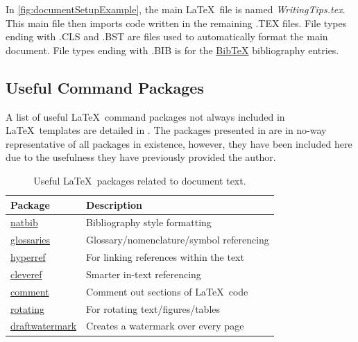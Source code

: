\noindent
In \cref{fig:documentSetupExample}, the main \LaTeX\ file is named \textit{WritingTips.tex}. 
This main file then imports code written in the remaining .TEX files. 
File types ending with .CLS and .BST are files used to automatically format the main document. 
File types ending with .BIB is for the \href{https://www.bibtex.org/}{Bib\TeX} bibliography entries. 

\subsection{Useful Command Packages}

A list of useful \LaTeX\ command packages not always included in \LaTeX\ templates are detailed in . 
The packages presented in  are in no-way representative of all packages in existence, however, they have been included here due to the usefulness they have previously provided the author. 

\begin{table}[hbt!]
	\centering
	\begin{threeparttable}[b]
		\caption{Useful \LaTeX\ packages related to document text.}
		\label{tab:usefulPackagesText}
		\begin{tabular}{ll}
			\toprule
			\textbf{Package} & \textbf{Description} \\ \midrule
			\href{https://ctan.org/pkg/natbib}{natbib} & Bibliography style formatting \\
			\href{https://ctan.org/pkg/glossaries}{glossaries} & Glossary/nomenclature/symbol referencing \\
			\href{https://ctan.org/pkg/hyperref}{hyperref} & For linking references within the text \\
			\href{https://ctan.org/pkg/cleveref}{cleveref} & Smarter in-text referencing \\ 
			\href{https://ctan.org/pkg/comment}{comment} & Comment out sections of \LaTeX\ code \\
			\href{https://ctan.org/pkg/rotating}{rotating} & For rotating text/figures/tables \\
			\href{https://ctan.org/pkg/draftwatermark}{draftwatermark} & Creates a watermark over every page \\
			\bottomrule
		\end{tabular}
	\end{threeparttable}
\end{table}

